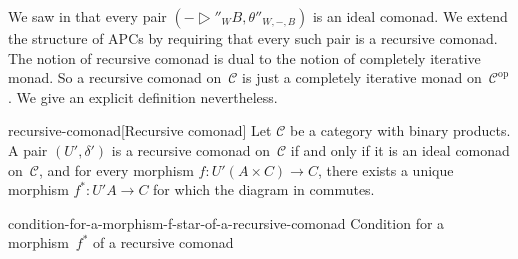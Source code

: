 \documentclass[copyright,creativecommons]{eptcs}
\newcommand{\edges}{\AtBeginMath\scriptstyle}
\newcommand{\id}{\mathrm{id}}
\newcommand{\op}[1]{#1^{\mathrm{op}}}
\begin{document}

We saw in  that every pair
$\left({-} ▷″_W B, θ″_{W, {-}, B}\right)$ is an ideal comonad. We extend the
structure of APCs by requiring that every such pair is a recursive comonad. The
notion of recursive comonad is dual to the notion of completely iterative monad.
So a recursive comonad on~$𝒞$ is just a completely iterative monad on~$\op{𝒞}$.
We give an explicit definition nevertheless.

\begin{extdefinition}{recursive-comonad}[Recursive comonad]
Let $𝒞$ be a category with binary products. A pair $(U′, δ′)$ is a recursive
comonad on~$𝒞$ if and only if it is an ideal comonad on~$𝒞$, and for every
morphism $f : U′(A × C) → C$, there exists a unique morphism $f^* : U′A → C$ for
which the diagram in
 commutes.
\end{extdefinition}
\begin{extfigure}{condition-for-a-morphism-f-star-of-a-recursive-comonad}
                 {Condition for a morphism~$f^*$ of a recursive comonad}


\end{extfigure}
\end{document}
